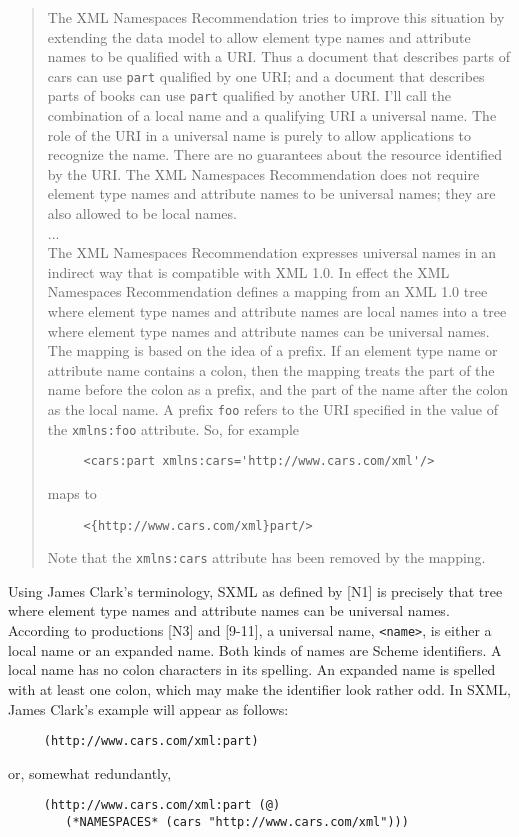 \documentclass[10pt]{article}
\begin{document}
\begin{quote}
The XML Namespaces Recommendation tries to improve this
situation by extending the data model to allow element type names and
attribute names to be qualified with a URI. Thus a document that
describes parts of cars can use \texttt{part} qualified by one URI; and a
document that describes parts of books can use \texttt{part} qualified by
another URI. I'll call the combination of a local name and a
qualifying URI a universal name. The role of the URI in a universal
name is purely to allow applications to recognize the name. There are
no guarantees about the resource identified by the URI. The XML
Namespaces Recommendation does not require element type names and
attribute names to be universal names; they are also allowed to be
local names.\\ ...\\ The XML Namespaces Recommendation expresses universal names in an
indirect way that is compatible with XML 1.0. In effect the XML
Namespaces Recommendation defines a mapping from an XML 1.0 tree where
element type names and attribute names are local names into a tree
where element type names and attribute names can be universal
names. The mapping is based on the idea of a prefix. If an element
type name or attribute name contains a colon, then the mapping treats
the part of the name before the colon as a prefix, and the part of the
name after the colon as the local name. A prefix \texttt{foo}
refers to the URI specified in the value of the \texttt{xmlns:foo}
attribute. So, for example\begin{verbatim}
     <cars:part xmlns:cars='http://www.cars.com/xml'/>
\end{verbatim}
maps to\begin{verbatim}
     <{http://www.cars.com/xml}part/>
\end{verbatim}
Note that the \texttt{xmlns:cars} attribute has been removed by the mapping.\end{quote}
Using James Clark's terminology, SXML as defined by [N1] is
precisely that tree where element type names and attribute names can
be universal names.  According to productions [N3] and [9-11], a
universal name, \texttt{<name>}, is either a local name or an expanded
name. Both kinds of names are Scheme identifiers. A local name has no
colon characters in its spelling. An expanded name is spelled with at
least one colon, which may make the identifier look rather odd. In
SXML, James Clark's example will appear as follows:\begin{verbatim}
     (http://www.cars.com/xml:part)
\end{verbatim}
or, somewhat redundantly, \begin{verbatim}
     (http://www.cars.com/xml:part (@)
        (*NAMESPACES* (cars "http://www.cars.com/xml")))
\end{verbatim}
\end{document}
